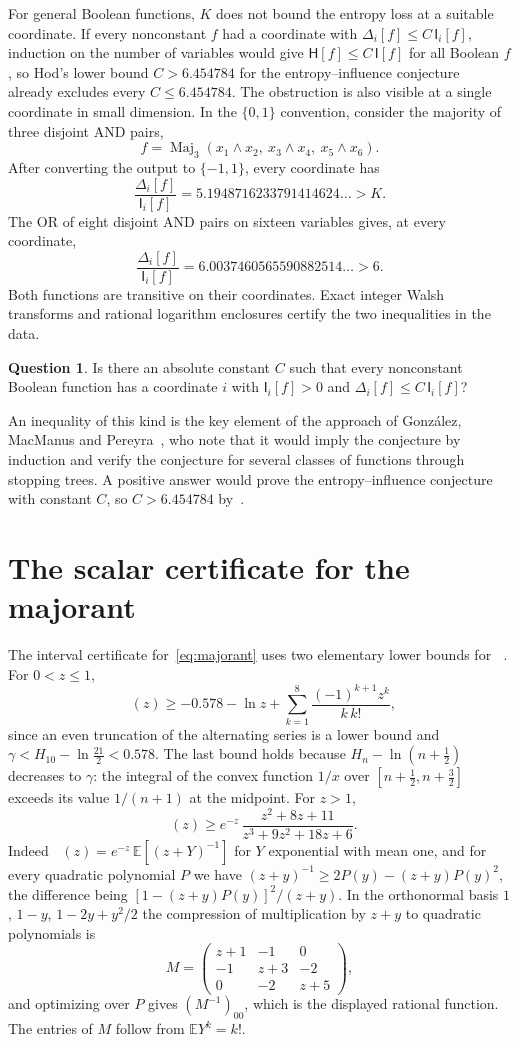 \documentclass[11pt]{amsart}
\theoremstyle{definition}
\newtheorem{question}[theorem]{Question}
\theoremstyle{remark}
\newcommand{\E}{\mathbb E}
\newcommand{\HH}{\mathsf H}
\newcommand{\I}{\mathsf I}
\DeclareMathOperator{\Ei}{E_1}
\begin{document}
For general Boolean functions, $K$ does not bound the entropy loss at a suitable coordinate. If every nonconstant $f$ had a coordinate with $\Delta_i[f]\le C\,\I_i[f]$, induction on the number of variables would give $\HH[f]\le C\,\I[f]$ for all Boolean $f$, so Hod's lower bound $C>6.454784$ for the entropy--influence conjecture~\cite{Hod17} already excludes every $C\le6.454784$. The obstruction is also visible at a single coordinate in small dimension. In the $\{0,1\}$ convention, consider the majority of three disjoint AND pairs,
\[
 f=\operatorname{Maj}_3(x_1\wedge x_2,\ x_3\wedge x_4,\ x_5\wedge x_6).
\]
After converting the output to $\{-1,1\}$, every coordinate has
\[
 \frac{\Delta_i[f]}{\I_i[f]}=5.1948716233791414624\ldots>K.
\]
The OR of eight disjoint AND pairs on sixteen variables gives, at every coordinate,
\[
 \frac{\Delta_i[f]}{\I_i[f]}=6.0037460565590882514\ldots>6.
\]
Both functions are transitive on their coordinates. Exact integer Walsh transforms and rational logarithm enclosures certify the two inequalities in the data.

\begin{question}
Is there an absolute constant $C$ such that every nonconstant Boolean function has a coordinate $i$ with $\I_i[f]>0$ and $\Delta_i[f]\le C\,\I_i[f]$?
\end{question}

An inequality of this kind is the key element of the approach of Gonz\'alez, MacManus and Pereyra~\cite{GMP26}, who note that it would imply the conjecture by induction and verify the conjecture for several classes of functions through stopping trees. A positive answer would prove the entropy--influence conjecture with constant $C$, so $C>6.454784$ by~\cite{Hod17}.

\appendix
\section{The scalar certificate for the majorant}\label{app:cert}

The interval certificate for~\eqref{eq:majorant} uses two elementary lower bounds for $\Ei$. For $0<z\le1$,
\[
 \Ei(z)\ge-0.578-\ln z+\sum_{k=1}^{8}\frac{(-1)^{k+1}z^k}{k\,k!},
\]
since an even truncation of the alternating series is a lower bound and $\gamma<H_{10}-\ln\frac{21}2<0.578$. The last bound holds because $H_n-\ln(n+\frac12)$ decreases to $\gamma$: the integral of the convex function $1/x$ over $[n+\frac12,n+\frac32]$ exceeds its value $1/(n+1)$ at the midpoint. For $z>1$,
\[
 \Ei(z)\ge e^{-z}\,\frac{z^2+8z+11}{z^3+9z^2+18z+6}.
\]
Indeed $\Ei(z)=e^{-z}\,\E[(z+Y)^{-1}]$ for $Y$ exponential with mean one, and for every quadratic polynomial $P$ we have $(z+y)^{-1}\ge2P(y)-(z+y)P(y)^2$, the difference being $[1-(z+y)P(y)]^2/(z+y)$. In the orthonormal basis $1$, $1-y$, $1-2y+y^2/2$ the compression of multiplication by $z+y$ to quadratic polynomials is
\[
 M=\begin{pmatrix}z+1&-1&0\\-1&z+3&-2\\0&-2&z+5\end{pmatrix},
\]
and optimizing over $P$ gives $(M^{-1})_{00}$, which is the displayed rational function. The entries of $M$ follow from $\E Y^k=k!$.
\end{document}

